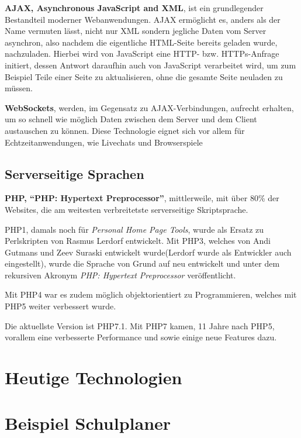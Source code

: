 \documentclass[a4paper,12pt]{scrartcl}      %
\let\oldcite\cite
\renewcommand{\cite}[1]{\textsuperscript{\oldcite{#1}}}
\newcommand{\spacer}{\par\bigskip\noindent}
\begin{document}
	\spacer\textbf{AJAX, Asynchronous JavaScript and XML}, ist ein grundlegender Bestandteil moderner Webanwendungen. AJAX ermöglicht es, anders als der Name vermuten lässt, nicht nur XML sondern jegliche Daten vom Server asynchron, also nachdem die eigentliche HTML-Seite bereits geladen wurde, nachzuladen. Hierbei wird von JavaScript eine HTTP- bzw. HTTPs-Anfrage initiert, dessen Antwort daraufhin auch von JavaScript verarbeitet wird, um zum Beispiel Teile einer Seite zu aktualisieren, ohne die gesamte Seite neuladen zu müssen.\cite{ajaxWiki}\par
	
	\spacer\textbf{WebSockets}, werden, im Gegensatz zu AJAX-Verbindungen, aufrecht erhalten, um so schnell wie möglich Daten zwischen dem Server und dem Client austauschen zu können. Diese Technologie eignet sich vor allem für Echtzeitanwendungen, wie Livechats und Browserspiele\cite{websocketWiki}\par
	
	\subsection{Serverseitige Sprachen}
	
	\spacer\textbf{PHP, ``PHP: Hypertext Preprocessor''}, mittlerweile, mit über 80\% der Websites, die am weitesten verbreitetste serverseitige Skriptsprache.\cite{phpCoverage}\par
	PHP1, damals noch für \emph{Personal Home Page Tools}, wurde als Ersatz zu Perlskripten von Rasmus Lerdorf entwickelt. Mit PHP3, welches von Andi Gutmans und Zeev Suraski entwickelt wurde(Lerdorf wurde als Entwickler auch eingestellt), wurde die Sprache von Grund auf neu entwickelt und unter dem rekursiven Akronym \emph{PHP: Hypertext Preprocessor} veröffentlicht.\par
	Mit PHP4 war es zudem möglich objektorientiert zu Programmieren, welches mit PHP5 weiter verbessert wurde.\par
	Die aktuellste Version ist PHP7.1. Mit PHP7 kamen, 11 Jahre nach PHP5, vorallem eine verbesserte Performance und sowie einige neue Features dazu.\cite{phpWiki}\par
	\newpage
	\section{Heutige Technologien}
	\newpage
	\section{Beispiel Schulplaner}
	
\end{document}

